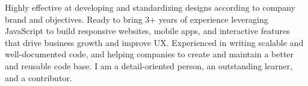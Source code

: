 Highly effective at developing and standardizing designs according to company brand and objectives. Ready to
bring 3+ years of experience leveraging JavaScript to build responsive websites, mobile apps, and interactive
features that drive business growth and improve UX. Experienced
in writing scalable and well-documented code, and helping companies to create and maintain a better
and reusable code base. I am a detail-oriented person, an outstanding learner, and a contributor.